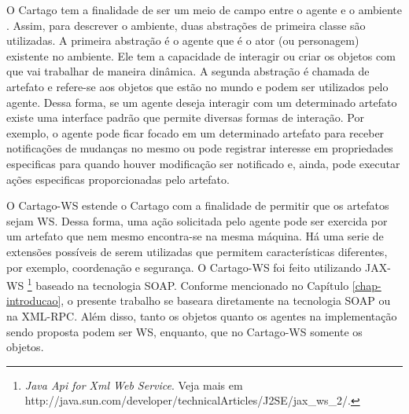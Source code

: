 O Cartago tem a finalidade de ser um meio de campo entre o agente e o
ambiente \cite{ricci31cartago}. Assim, para descrever o ambiente, duas
abstrações de primeira classe são utilizadas. A primeira abstração é o agente
que é o ator (ou personagem) existente no ambiente. Ele tem a capacidade de
interagir ou criar os objetos com que vai trabalhar de maneira dinâmica. A
segunda abstração é chamada de artefato e refere-se aos objetos que estão no
mundo e podem ser utilizados pelo agente. Dessa forma, se um agente deseja
interagir com um determinado artefato existe uma interface padrão que permite
diversas formas de interação. Por exemplo, o agente pode ficar focado em um determinado
artefato para receber notificações de mudanças no mesmo ou pode
registrar interesse em propriedades especificas para quando houver modificação
ser notificado e, ainda, pode executar ações especificas proporcionadas pelo
artefato.

O Cartago-WS \cite{piunti2009soa} estende o Cartago com a finalidade de
permitir que os artefatos sejam WS. Dessa forma, uma ação solicitada
pelo agente pode ser exercida por um artefato que nem mesmo encontra-se na
mesma máquina. Há uma serie de extensões possíveis de serem utilizadas que
permitem características diferentes, por exemplo, coordenação e segurança.
O Cartago-WS foi feito utilizando JAX-WS
\footnote{\emph{Java Api for Xml Web Service}. Veja mais em
http://java.sun.com/developer/technicalArticles/J2SE/jax\_ws\_2/.} baseado na
tecnologia SOAP. Conforme mencionado no Capítulo \ref{chap-introducao}, o
presente trabalho se baseara diretamente na tecnologia SOAP ou na XML-RPC.
Além disso, tanto os objetos quanto os agentes na implementação sendo proposta
podem ser WS, enquanto, que no Cartago-WS somente os objetos.

